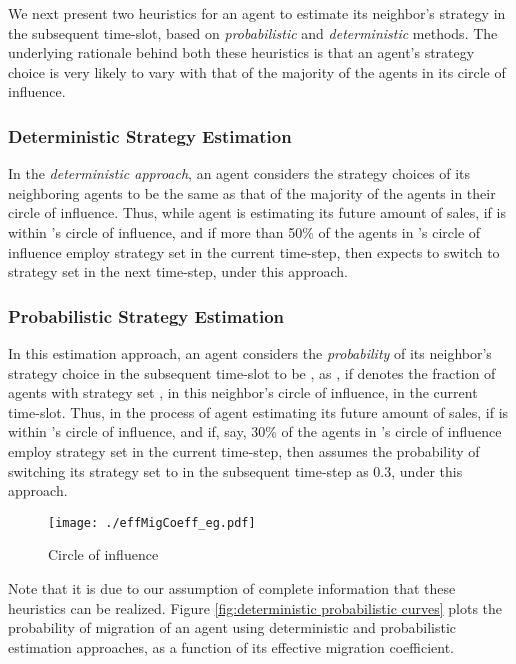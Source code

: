 \documentclass[smallextended]{svjour3}
\begin{document}
\par We next present two
heuristics for an agent to estimate its neighbor's strategy in the subsequent
time-slot, based on \emph{probabilistic} and \emph{deterministic} methods. The
underlying rationale behind both these heuristics is that an agent's strategy
choice is very likely to vary with that of the majority of the agents in its
circle of influence.

\subsubsection{Deterministic Strategy Estimation} In the \emph{deterministic approach}, an
agent considers the strategy choices of its neighboring agents to be the same as
that of the majority of the agents in their circle of influence. Thus, while
agent  is estimating its future amount of sales, if  is within 's
circle of influence, and if more than 50\% of the agents in 's circle of
influence employ strategy set  in the current time-step, then  expects
 to switch to strategy set  in the next time-step, under this
approach.

\subsubsection{Probabilistic Strategy Estimation} In this estimation approach,
an agent considers the \emph{probability} of its neighbor's strategy choice in
the subsequent time-slot to be , as , if  denotes the fraction of
agents with strategy set , in this neighbor's circle of influence, in the
current time-slot. Thus, in the process of agent  estimating its future
amount of sales, if  is within 's circle of influence, and if, say,
30\% of the agents in 's circle of influence employ strategy set  in the
current time-step, then  assumes the probability of  switching its
strategy set to  in the subsequent time-step as 0.3, under this approach.

\begin{figure}
\begin{center}
\texttt{[image: ./effMigCoeff\_eg.pdf]}
\caption{Circle of influence}
\label{fig:effMigCoeff example}
\end{center}
\end{figure}

\par Note that it is due to our assumption of complete information that
these heuristics can be realized. Figure \ref{fig:deterministic probabilistic
curves} plots the probability of migration of an agent using deterministic
and probabilistic estimation approaches, as a function of its effective
migration coefficient.
\end{document}
